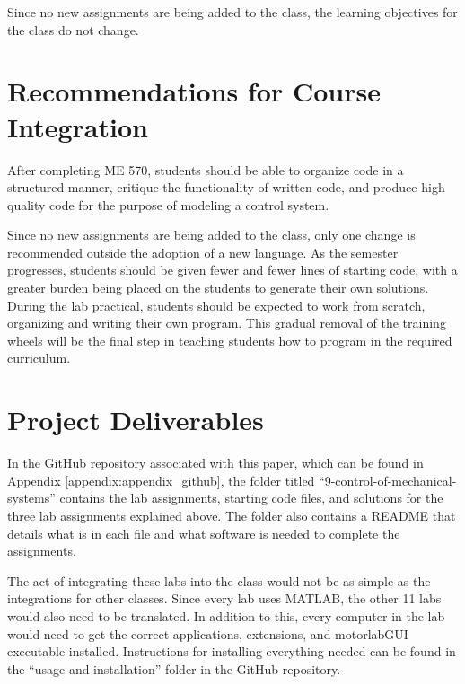 Since no new assignments are being added to the class, the learning objectives for the class do not change.

\section{Recommendations for Course Integration}

After completing ME 570, students should be able to organize code in a structured manner, critique the functionality of written
code, and produce high quality code for the purpose of modeling a control system. 

Since no new assignments are being added to the class, only one change is recommended outside the adoption of a new language.
As the semester progresses, students should be given fewer and fewer lines of starting code, with a greater burden being placed
on the students to generate their own solutions. During the lab practical, students should be expected to work from scratch,
organizing and writing their own program. This gradual removal of the training wheels will be the final step in teaching 
students how to program in the required curriculum.

\section{Project Deliverables}

In the GitHub repository associated with this paper, which can be found in Appendix \ref{appendix:appendix_github},
the folder titled ``9-control-of-mechanical-systems'' contains the lab assignments, starting code files, and solutions for the three
lab assignments explained above. The folder also contains a README that details what is in each file and what software is needed 
to complete the assignments. 

The act of integrating these labs into the class would not be as simple as the integrations for other classes. Since every lab 
uses MATLAB, the other 11 labs would also need to be translated. In addition to this, every computer in the lab would need to 
get the correct applications, extensions, and motorlabGUI executable installed. Instructions for installing everything needed 
can be found in the ``usage-and-installation'' folder in the GitHub repository.
